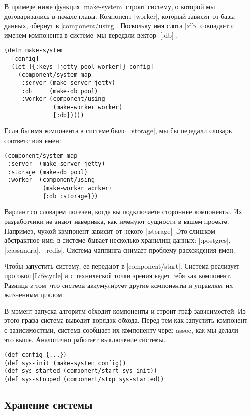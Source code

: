В примере ниже функция \spverb|make-system| строит систему, о которой мы договаривались
в начале главы. Компонент \spverb|worker|, который зависит от базы данных, обернут в
\spverb|component/using|. Поскольку имя слота \spverb|:db| совпадает с именем компонента в
системе, мы передали вектор \spverb|[:db]|.

\begin{verbatim}
(defn make-system
  [config]
  (let [{:keys [jetty pool worker]} config]
    (component/system-map
     :server (make-server jetty)
     :db     (make-db pool)
     :worker (component/using
              (make-worker worker)
              [:db]))))
\end{verbatim}

Если бы имя компонента в системе было \spverb|:storage|, мы бы передали словарь
соответствия имен:

\begin{verbatim}
(component/system-map
 :server  (make-server jetty)
 :storage (make-db pool)
 :worker  (component/using
           (make-worker worker)
           {:db :storage}))
\end{verbatim}

Вариант со словарем полезен, когда вы подключаете сторонние компоненты. Их
разработчики не знают наверняка, как именуют сущности в вашем проекте. Например,
чужой компонент зависит от некого \spverb|:storage|. Это слишком абстрактное имя: в
системе бывает несколько хранилищ данных: \spverb|:postgres|, \spverb|:cassandra|,
\spverb|:redis|. Система маппинга снимает проблему расхождения имен.

Чтобы запустить систему, ее передают в \spverb|component/start|. Система реализует
протокол \spverb|Lifecycle| и с технической точки зрения ведет себя как
компонент. Разница в том, что система аккумулирует другие компоненты и управляет
их жизненным циклом.

В момент запуска алгоритм обходит компоненты и строит граф зависимостей. Из
этого графа система выводит порядок обхода. Перед тем как запустить компонент с
зависимостями, система сообщает их компоненту через assoc, как мы делали это
выше. Аналогично работает выключение системы.

\begin{verbatim}
(def config {...})
(def sys-init (make-system config))
(def sys-started (component/start sys-init))
(def sys-stopped (component/stop sys-started))
\end{verbatim}

\subsection{Хранение системы}

